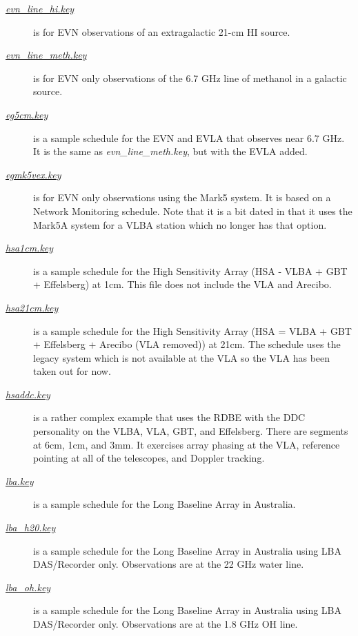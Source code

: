 \documentclass{report}
\begin{document}
\begin{description}
\item[
{\href{examples/evn\_line\_hi.key}{{\sl evn\_line\_hi.key}}}]
is for EVN observations of an extragalactic
21-cm HI source.

\item[
{\href{examples/evn\_line\_meth.key}{{\sl evn\_line\_meth.key}}}]
is for EVN only observations of the
6.7 GHz line of methanol in a galactic source.

\item[
{\href{examples/eg5cm.key}{{\sl eg5cm.key}}}] is a
sample schedule for the EVN and EVLA that observes near 6.7 GHz.  It
is the same as {\sl evn\_line\_meth.key}, but with the EVLA added.

\item[
{\href{examples/egmk5vex.key}{{\sl egmk5vex.key}}}]
is for EVN only observations using the Mark5 system.  It is based on
a Network Monitoring schedule.
Note that it is a bit dated in that it uses the Mark5A system for 
a VLBA station which no longer has that option.

\item[
{\href{examples/hsa1cm.key}{{\sl hsa1cm.key}}}] is a
sample schedule for the High Sensitivity Array (HSA - VLBA + GBT +
Effelsberg) at 1cm.  This file does not include the
VLA and Arecibo.

\item[
{\href{examples/hsa21cm.key}{{\sl hsa21cm.key}}}] is a
sample schedule for the High Sensitivity Array (HSA = VLBA + GBT +
Effelsberg + Arecibo (VLA removed)) at 21cm.  The schedule uses the
legacy system which is not available at the VLA so the VLA has been taken
out for now.

\item[
{\href{examples/hsaddc.key}{{\sl hsaddc.key}}}] is
a rather complex example that uses the RDBE with the DDC personality
on the VLBA, VLA, GBT, and Effelsberg.  There are segments
at 6cm, 1cm, and 3mm.  It exercises array phasing 
at the VLA, reference pointing at all of the telescopes, and Doppler 
tracking.

\item[
{\href{examples/lba.key}{{\sl lba.key}}}] is a
sample schedule for the Long Baseline Array in Australia.

\item[
{\href{examples/lba\_h2o.key}{{\sl lba\_h20.key}}}] is a
sample schedule for the Long Baseline Array in Australia
using LBA DAS/Recorder only.  Observations are at the 22 GHz
water line.

\item[
{\href{examples/lba\_oh.key}{{\sl lba\_oh.key}}}] is a
sample schedule for the Long Baseline Array in Australia
using LBA DAS/Recorder only.  Observations are at the 1.8 GHz
OH line.


\end{description}
\end{document}

